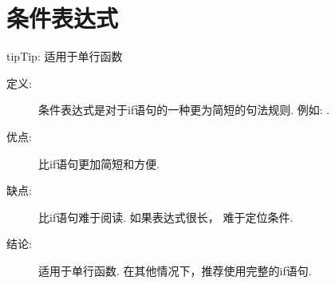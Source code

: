 \documentclass[a4paper,10pt,english]{sphinxmanual}
\begin{document}
\section{条件表达式}
\label{\detokenize{python_language_rules:id8}}
\begin{sphinxadmonition}{tip}{Tip:}
适用于单行函数
\end{sphinxadmonition}
\begin{description}
\item[{定义:}] \leavevmode
条件表达式是对于if语句的一种更为简短的句法规则. 例如:  .

\item[{优点:}] \leavevmode
比if语句更加简短和方便.

\item[{缺点:}] \leavevmode
比if语句难于阅读. 如果表达式很长， 难于定位条件.

\item[{结论:}] \leavevmode
适用于单行函数. 在其他情况下，推荐使用完整的if语句.

\end{description}
\end{document}
